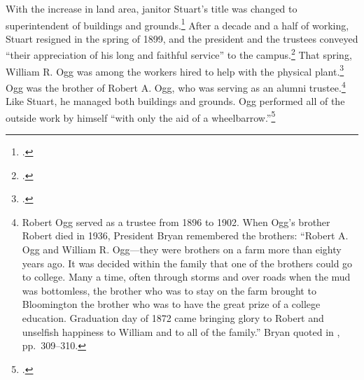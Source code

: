 \documentclass[
  american,
  letterpaper,
]{scrreprt}
\begin{document}
With the increase in land area, janitor Stuart's title was changed to
superintendent of buildings and grounds.\footnote{.}
After a decade and a half of working, Stuart resigned in the spring of
1899, and the president and the trustees conveyed ``their appreciation
of his long and faithful service'' to the campus.\footnote{.}
That spring, William R. Ogg was among the workers hired to help with the
physical plant.\footnote{.} Ogg was the brother of Robert A. Ogg, who was
serving as an alumni trustee.\footnote{Robert Ogg served as a trustee
  from 1896 to 1902. When Ogg's brother Robert died in 1936, President
  Bryan remembered the brothers: ``Robert A. Ogg and William R.
  Ogg---they were brothers on a farm more than eighty years ago. It was
  decided within the family that one of the brothers could go to
  college. Many a time, often through storms and over roads when the mud
  was bottomless, the brother who was to stay on the farm brought to
  Bloomington the brother who was to have the great prize of a college
  education. Graduation day of 1872 came bringing glory to Robert and
  unselfish happiness to William and to all of the family.'' Bryan
  quoted in , pp.~309--310.} Like Stuart, he managed both buildings and
grounds. Ogg performed all of the outside work by himself ``with only
the aid of a wheelbarrow.''\footnote{.}
\end{document}
